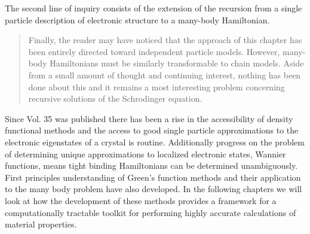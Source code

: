 The second line of inquiry consists of the extension of the recursion from a single 
particle description of electronic structure to a many-body Hamiltonian.
%
\begin{quote}
Finally, the reader may have noticed that the approach of this chapter has been entirely directed
toward independent particle models. However, many-body Hamiltonians must be similarly 
transformable to chain models. Aside from a small amount of thought and continuing interest, 
nothing has been done about this and it remains a most interesting problem concerning recursive 
solutions of the Schrodinger equation.
\end{quote}

	Since Vol. 35 was published there has been a rise in the accessibility of density functional methods 
and the access to good single particle approximations to the electronic eigenstates of a crystal
is routine. Additionally progress on the problem of determining unique approximations to localized
electronic states, Wannier functions, means tight binding Hamiltonians can be determined unambiguously.
First principles understanding of Green's function methods and their application to the many body
problem have also developed. In the following chapters we will look at how the development of these
methods provides a framework for a computationally tractable toolkit for performing highly 
accurate calculations of material properties.

